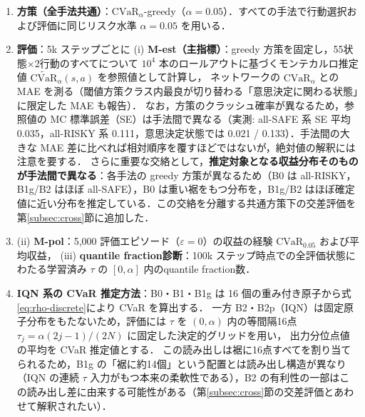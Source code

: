 \documentclass[a4paper,10pt]{jsarticle}
\theoremstyle{definition}
\newcommand{\CVaR}{\mathrm{CVaR}}
\begin{document}
\begin{enumerate}
\begin{itemize}
    \item \textbf{B2p IQN（学習時歪み $\tau$）}：B2 と同一だが，\textbf{学習時のサンプリング（現在側の $\tau_i$ とターゲット側の $\tau'_j$ の双方）}のみ $\tau = g^{-1}_{\alpha,\lambda}(U(0,1))$ に変更し（分位点 Huber 損失の level には現在側 $\tau_i$ を，ターゲット原子の生成にはターゲット側 $\tau'_j$ を用い，重みは等重み $1/N$ のまま重要度重みは付けない），学習時から解像度を下側裾に集中させる対抗手法．行動選択（$\tau\sim U(0,\alpha)$）と決定的評価グリッドは B2 と完全同一である．
  \end{itemize}
  \item \textbf{方策（全手法共通）}：$\CVaR_\alpha$-greedy（$\alpha=0.05$）．すべての手法で行動選択および評価に同じリスク水準 $\alpha=0.05$ を用いる．
  \item \textbf{評価}：5k ステップごとに (i) \textbf{M-est（主指標）}：greedy 方策を固定し，55状態$\times$2行動のすべてについて $10^4$ 本のロールアウトに基づくモンテカルロ推定値 $\widetilde{\mathrm{CVaR}}_\alpha(s,a)$ を参照値として計算し，
  ネットワークの $\CVaR_\alpha$ との MAE を測る（閾値方策クラス内最良が切り替わる「意思決定に関わる状態」に限定した MAE も報告）．
  なお，方策のクラッシュ確率が異なるため，参照値の MC 標準誤差（SE）は手法間で異なる（実測: all-SAFE 系 SE 平均 0.035，all-RISKY 系 0.111，意思決定状態では 0.021 / 0.133）．手法間の大きな MAE 差に比べれば相対順序を覆すほどではないが，絶対値の解釈には注意を要する．
  さらに重要な交絡として，\textbf{推定対象となる収益分布そのものが手法間で異なる}：各手法の greedy 方策が異なるため（B0 は all-RISKY，B1g/B2 はほぼ all-SAFE），B0 は重い裾をもつ分布を，B1g/B2 はほぼ確定値に近い分布を推定している．この交絡を分離する共通方策下の交差評価を第\ref{subsec:cross}節に追加した．
  \item (ii) \textbf{M-pol}：5{,}000 評価エピソード（$\varepsilon=0$）の収益の経験 $\CVaR_{0.05}$ および平均収益，
  (iii) \textbf{quantile fraction診断}：100k ステップ時点での全評価状態にわたる学習済み $\tau$ の $[0,\alpha]$ 内のquantile fraction数．
  \item \textbf{IQN 系の CVaR 推定方法}：B0・B1・B1g は 16 個の重み付き原子から式\eqref{eq:rho-discrete}により CVaR を算出する．
  一方 B2・B2p（IQN）は固定原子分布をもたないため，評価には $\tau$ を $(0,\alpha)$ 内の等間隔16点 $\tau_j=\alpha(2j-1)/(2N)$ に固定した決定的グリッドを用い，
  出力分位点値の平均を CVaR 推定値とする．
  この読み出しは裾に16点すべてを割り当てられるため，B1g の「裾に約14個」という配置とは読み出し構造が異なり（IQN の連続 $\tau$ 入力がもつ本来の柔軟性である），B2 の有利性の一部はこの読み出し差に由来する可能性がある（第\ref{subsec:cross}節の交差評価とあわせて解釈されたい）．
\end{enumerate}
\end{document}
